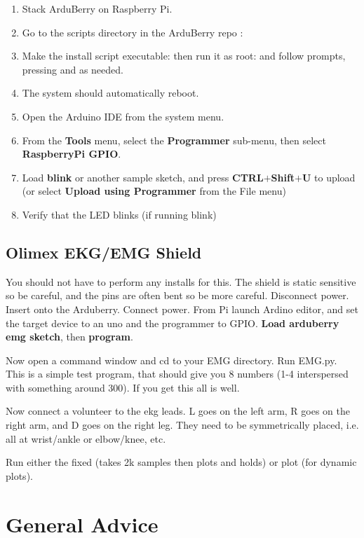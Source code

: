 \begin{enumerate}
\item Stack ArduBerry on Raspberry Pi.
\item Go to the scripts directory in the ArduBerry repo :
\item Make the install script executable: then run it as root:  and follow prompts, pressing  and  as needed.
\item The system should automatically reboot.
\item Open the Arduino IDE from the system menu.
\item From the \textbf{Tools} menu, select the \textbf{Programmer} sub-menu, then select \textbf{RaspberryPi GPIO}.
\item Load \textbf{blink} or another sample sketch, and press \textbf{CTRL}$+$\textbf{Shift}$+$\textbf{U} to upload (or select \textbf{Upload using Programmer} from the File menu)
\item Verify that the LED blinks (if running blink)
\end{enumerate}

\subsection{Olimex EKG/EMG Shield}

You should not have to perform any installs for this.  The shield is static sensitive so be careful, and the pins are often bent so be more careful.  Disconnect power.  Insert onto the Arduberry. Connect power.  From Pi launch Ardino editor, and set the target device to an uno and the programmer to GPIO. \textbf{Load arduberry emg sketch}, then \textbf{program}.

Now open a command window and cd to your EMG directory.  Run EMG.py.  This is a simple test program, that should give you 8 numbers (1-4 interspersed with something around 300).  If you get this all is well.

Now connect a volunteer to the ekg leads.  L goes on the left arm, R goes on the right arm, and D goes on the right leg.  They need to be symmetrically placed, i.e. all at wrist/ankle or elbow/knee, etc.

Run either the fixed (takes 2k samples then plots and holds) or plot (for dynamic plots).

\section{General Advice}

